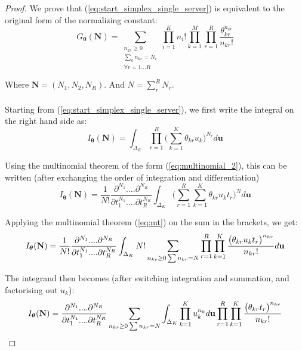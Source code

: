 \begin{proof}
    We prove that (\ref{eq:start_simplex_single_server}) is equivalent to the original form of the normalizing constant:
    \begin{equation}\label{eq:end_proof}
    G_{\boldsymbol{\theta}}(\mathbf{N}) =  \sum_{\substack{n_{kr} \geq 0 \\ \sum_k n_{kr} = N_r \\ \forall r= 1...R}} \prod_{i=1}^{K} n_i! \prod_{k=1}^{M} \prod_{r=1}^{R} \frac{\theta_{kr}^{n_{kr}}}{n_{kr}!}
    \end{equation}
    
    Where \(\mathbf{N} = (N_1, N_2 \dot ,N_R)\). And \(N = \sum_r^R N_r\). 
    \\\\
    Starting from (\ref{eq:start_simplex_single_server}), we first write the integral on the right hand side as:
    \begin{equation*}
        I_{\boldsymbol{\theta}}(\mathbf{N}) =  \int_{\Delta_K}\prod_{r=1}^R \bigg( \sum_{k=1}^K \theta_{kr} u_k \bigg)^{N_r} d\mathbf{u}
    \end{equation*}
    
    Using the multinomial theorem of the form (\ref{eq:multinomial_2}), this can be written (after exchanging the order of integration and differentiation)
    \begin{equation}
        I_{\boldsymbol{\theta}}(\mathbf{N}) =  \frac{1}{N!} \frac{\partial^{N_1}....\partial^{N_R}}{\partial t_1^{N_1}....\partial t_R^{N_R}} \int_{\Delta_K}  \bigg( \sum_{r=1}^R \sum_{k=1}^K \theta_{kr} u_k t_r \bigg)^{N} d\mathbf{u}
    \end{equation}

    Applying the multinomial theorem (\ref{eq:mt}) on the sum in the brackets, we get:
    \begin{equation}
        I_{\boldsymbol{\theta}}(\mathbf{N}) =  \frac{1}{N!} \frac{\partial^{N_1}....\partial^{N_R}}{\partial t_1^{N_1}....\partial t_R^{N_R}} \int_{\Delta_K} N! \sum_{n_{kr} \geq 0 \\ \sum n_{kr} = N} \prod_{r=1}^R \prod_{k=1}^K \frac{\big(  \theta_{kr} u_k t_r \big)^{n_{kr}}}{n_{kr}!} d\mathbf{u}
    \end{equation}
    
    The integrand then becomes (after switching integration and summation, and factorising out \(u_k\)):
    \begin{equation}
        I_{\boldsymbol{\theta}}(\mathbf{N}) = \frac{\partial^{N_1}....\partial^{N_R}}{\partial t_1^{N_1}....\partial t_R^{N_R}}  \sum_{n_{kr} \geq 0 \\ \sum n_{kr} = N} \int_{\Delta_K} \prod_{k=1}^K u_k^{n_k} d\mathbf{u} \prod_{r=1}^R \prod_{k=1}^K \frac{\big(  \theta_{kr} t_r \big)^{n_{kr}}}{n_{kr}!} 
    \end{equation}
    

\end{proof}
